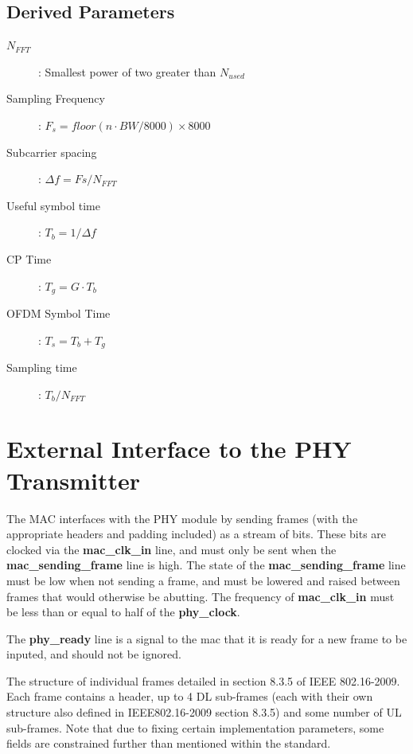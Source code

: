 \documentclass[dvips,10pt,twocolumn]{article}
\begin{document}

\subsection{Derived Parameters}

\begin{description}
	\item[$N_{FFT}$]: Smallest power of two greater than $N_{used}$
	\item[Sampling Frequency]: $F_s = floor ( n \cdot BW / 8000 )
		\times 8000 $
	\item[Subcarrier spacing]: $\Delta f = F s / N_{FFT} $
	\item[Useful symbol time]: $T_b = 1 / \Delta f$
	\item[CP Time]: $T_g = G \cdot T_b$
	\item[OFDM Symbol Time]: $T_s = T_b + T_g$
	\item[Sampling time]: $T_b / N_{FFT}$
\end{description}


\section{External Interface to the PHY Transmitter}
\label{sec:frame}
The MAC interfaces with the PHY module by sending frames (with the
appropriate headers and padding included) as a stream of bits.  These bits
are clocked via the \textbf{mac\_clk\_in} line, and must only be sent when
the \textbf{mac\_sending\_frame} line is high.  The state of the
\textbf{mac\_sending\_frame} line must be low when not sending a frame, and
must be lowered and raised between frames that would otherwise be abutting.
The frequency of \textbf{mac\_clk\_in} must be less than or equal to half
of the \textbf{phy\_clock}.

The \textbf{phy\_ready} line is a signal to the mac that it is ready for a
new frame to be inputed, and should not be ignored.

The structure of individual frames detailed in section 8.3.5 of IEEE
802.16-2009.  Each frame contains a header, up to 4 DL sub-frames (each with
their own structure also defined in IEEE802.16-2009 section 8.3.5) and some
number of UL sub-frames.  Note that due to fixing certain implementation
parameters, some fields are constrained further than mentioned within the
standard.
\end{document}

